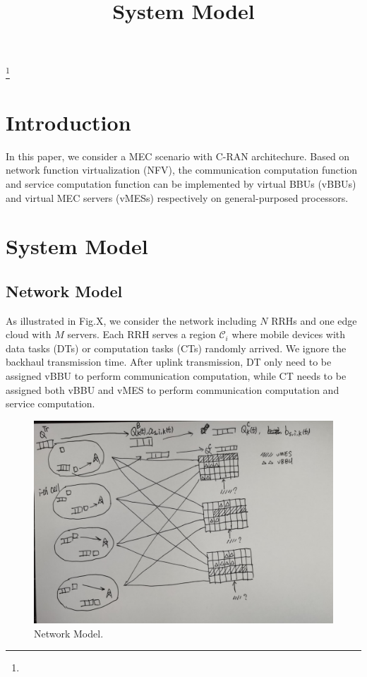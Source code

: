 \documentclass[12pt, draftclsnofoot, onecolumn]{IEEEtran}
\begin{document}
	
\title{System Model}

\author{}
\thanks{}

\maketitle

\begin{abstract}
	
\end{abstract}

\begin{IEEEkeywords}

\end{IEEEkeywords}

\IEEEpeerreviewmaketitle

\section{Introduction}
In this paper, we consider a MEC scenario with C-RAN architechure. Based on network function virtualization (NFV), the communication computation function and service computation function can be implemented by virtual BBUs (vBBUs) and virtual MEC servers (vMESs) respectively on general-purposed processors.

\section{System Model}
\subsection{Network Model}
As illustrated in Fig.X, we consider the network including $N$ RRHs and one edge cloud with $M$ servers. Each RRH serves a region $\mathcal{C}_{i}$ where mobile devices with data tasks (DTs) or computation tasks (CTs) randomly arrived. We ignore the backhaul transmission time. After uplink transmission, DT only need to be assigned vBBU to perform communication computation, while CT needs to be assigned both vBBU and vMES to perform communication computation and service computation.

\begin{figure}[tb]
	\centering
	\includegraphics[scale = 0.1]{fig/scenario.jpg}
	\caption{Network Model.}
	\label{fig:scenario}
\end{figure}
\end{document}
